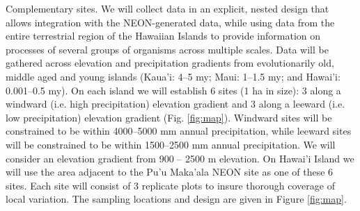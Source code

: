 \documentclass[11pt]{article}
\makeatletter
\renewcommand{\paragraph}{\@startsection{paragraph}{4}{\z@}
  {1ex \@plus 1ex \@minus .2ex}{-1em}
  {\normalfont\normalsize\it}
}
\makeatother
\begin{document}
\paragraph{Complementary sites.}
We will collect data in an explicit, nested design that allows
integration with the NEON-generated data, while using data from the
entire terrestrial region of the Hawaiian Islands to provide
information on processes of several groups of organisms across
multiple scales. Data will be gathered across elevation and
precipitation gradients from evolutionarily old, middle aged and young
islands (Kaua'i: 4--5 my; Maui: 1--1.5 my; and Hawai'i: 0.001--0.5
my).  On each island we will establish 6 sites (1 ha in size): 3 along
a windward (i.e. high precipitation) elevation gradient and 3 along a
leeward (i.e. low precipitation) elevation gradient
(Fig. \ref{fig:map}).  Windward sites will be constrained to be within
4000--5000 mm annual precipitation, while leeward sites will be
constrained to be within 1500--2500 mm annual precipitation.  We will
consider an elevation gradient from 900 -- 2500 m elevation.  On
Hawai'i Island we will use the area adjacent to the Pu'u Maka'ala NEON
site as one of these 6 sites.  Each site will consist of 3 replicate
plots to insure thorough coverage of local variation. The sampling
locations and design are given in Figure \ref{fig:map}.


\end{document}
